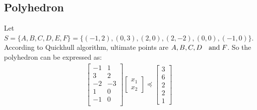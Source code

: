 \documentclass[10pt,a4paper]{article}
\begin{document}
\subsection{Polyhedron}
Let $S=\{A,B,C,D,E,F\}=\{(-1, 2), (0, 3), (2, 0), (2, -2), (0, 0), (-1, 0)\}$.
According to Quickhull algorithm\cite{wiki:xxx}, ultimate points are $A, B, C, D \text{ \; and\;} F$. So the polyhedron can be expressed as:
\begin{align*}
\begin{bmatrix}
-1 & 1\\
3 & 2\\
-2 & -3\\
1 & 0\\
-1 & 0\\
\end{bmatrix}
\begin{bmatrix}
x_1\\
x_2
\end{bmatrix}\preceq
\begin{bmatrix}
3\\6\\2\\2\\1
\end{bmatrix}
\end{align*}

	\renewcommand\refname{Bibliography}
	
	
\end{document}
